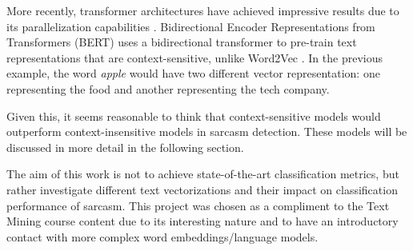 More recently, transformer architectures have achieved impressive results due to its parallelization capabilities \citep{vaswani2017attention}. Bidirectional Encoder Representations from Transformers (BERT) uses a bidirectional transformer to pre-train text representations that are context-sensitive, unlike Word2Vec \citep{devlin2019ppt}. In the previous example, the word \textit{apple} would have two different vector representation: one representing the food and another representing the tech company.

Given this, it seems reasonable to think that context-sensitive models would outperform context-insensitive models in sarcasm detection. These models will be discussed in more detail in the following section.

The aim of this work is not to achieve state-of-the-art classification metrics, but rather investigate different text vectorizations and their impact on classification performance of sarcasm. This project was chosen as a compliment to the Text Mining course content due to its interesting nature and to have an introductory contact with more complex word embeddings/language models.


	

